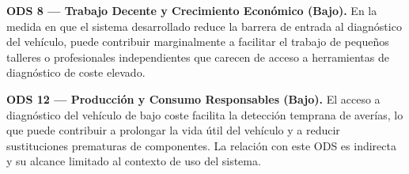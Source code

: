 \textbf{ODS 8 — Trabajo Decente y Crecimiento Económico (Bajo).} En la medida en que el sistema desarrollado reduce la barrera de entrada al diagnóstico del vehículo, puede contribuir marginalmente a facilitar el trabajo de pequeños talleres o profesionales independientes que carecen de acceso a herramientas de diagnóstico de coste elevado.

\textbf{ODS 12 — Producción y Consumo Responsables (Bajo).} El acceso a diagnóstico del vehículo de bajo coste facilita la detección temprana de averías, lo que puede contribuir a prolongar la vida útil del vehículo y a reducir sustituciones prematuras de componentes. La relación con este ODS es indirecta y su alcance limitado al contexto de uso del sistema.
